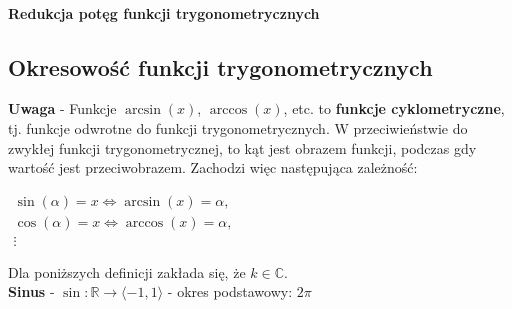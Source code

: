 \documentclass[14pt,a4paper]{extarticle}
\begin{document}
\hfill\break\\

\noindent\textbf{Redukcja potęg funkcji trygonometrycznych}

\begin{center}
   {%
   
   \setlength\extrarowheight{9pt}
   
   }%
\end{center}

\subsection{Okresowość funkcji trygonometrycznych}
\noindent\textbf{Uwaga} - Funkcje $\arcsin(x)$, $\arccos(x)$, etc. to \textbf{funkcje cyklometryczne}, tj.
funkcje odwrotne do funkcji trygonometrycznych. W przeciwieństwie do zwykłej funkcji trygonometrycznej, to kąt
jest obrazem funkcji, podczas gdy wartość jest przeciwobrazem. Zachodzi więc następująca zależność:

\begin{center}

\(
\begin{array}{c}
   \sin(\alpha) = x \Leftrightarrow \arcsin(x) = \alpha,\\
   \cos(\alpha) = x \Leftrightarrow \arccos(x) = \alpha,\\
   \vdots 
\end{array}
\)
   
\end{center}

\noindent Dla poniższych definicji zakłada się, że $k \in \mathbb{C}$.\\

\noindent\textbf{Sinus} - $\sin: \mathbb{R} \rightarrow \langle-1, 1\rangle $ - okres podstawowy: $2\pi$
\end{document}
